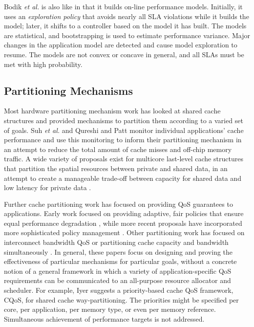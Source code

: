 %
Bodik \emph{et al.}\cite{bodik-acdc09} is also like \pacora in that it builds on-line performance models.
Initially, it uses an \emph{exploration policy} that avoids nearly all SLA violations while it builds the model;
later, it shifts to a controller based on the model it has built.
The models are statistical, and bootstrapping is used to estimate performance variance.
Major changes in the application model are detected and cause model exploration to resume.
The models are not convex or concave in general, and all SLAs must be met with high probability.

\subsection{Partitioning Mechanisms}
\label{sec:rel:pm}

%
Most hardware partitioning mechanism work has looked at shared cache structures and provided mechanisms to partition them according to a varied set of goals.  Suh \emph{et al.}\cite{876484, 967444} and Qureshi and Patt \cite{1194855} monitor individual applications' cache performance and use this monitoring to inform their partitioning mechanism in an attempt to reduce the total amount of cache misses and off-chip memory traffic. A wide variety of proposals exist for multicore last-level cache structures that partition the spatial resources between private and shared data, in an attempt to create a manageable trade-off between capacity for shared data and low latency for private data \cite{1275005,1194858,1318096,1088154,1399973,1069998,1399982}.

Further cache partitioning work has focused on providing QoS guarantees to applications. Early work focused on providing adaptive, fair policies that ensure equal performance degradation \cite{605420,1086328}, while more recent proposals have incorporated more sophisticated policy management \cite{1241608,1331730,1152161,1254886}. Other partitioning work has focused on interconnect bandwidth QoS \cite{1382130} or partitioning cache capacity and bandwidth simultaneously \cite{1250671}. In general, these papers focus on designing and proving the effectiveness of particular mechanisms for particular goals, without a concrete notion of a general framework in which a variety of application-specific QoS requirements can be communicated to an all-purpose resource allocator and scheduler.
%
For example, Iyer\cite{1006246} suggests a priority-based cache QoS framework, CQoS, for shared cache way-partitioning.
The priorities might be specified per core, per application, per memory type, or even per memory reference.
Simultaneous achievement of performance targets is not addressed.

